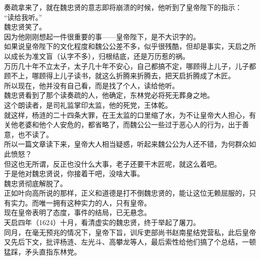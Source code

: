\begin{multicols}{\theparacolNo}
奏疏拿来了，就在魏忠贤的意志即将崩溃的时候，他听到了皇帝陛下的指示：\\

“读给我听。”\\

魏忠贤笑了。\\

因为他刚刚想起一件很重要的事——皇帝陛下，是不大识字的。\\

如果说皇帝陛下的文化程度和魏公公差不多，似乎很残酷，但却是事实，天启之所以成长为准文盲（认字不多），归根结底，还是万历惹的祸。\\

万历几十年不立太子，太子几十年不安心，自己都搞不定，哪顾得上儿子，儿子都顾不上，哪顾得上儿子读书，就这么折腾来折腾去，把天启折腾成了木匠。\\

所以现在，他并没有自己看，而是找了个人，读给他听。\\

魏忠贤看到了那个读奏疏的人，他确定，东林党必将死无葬身之地。\\

这个朗读者，是司礼监掌印太监，他的死党，王体乾。\\

就这样，杨涟的二十四条大罪，在王太监的口里缩了水，为不让皇帝大人担心，有关他老婆和他个人安危的，都省略了，而魏公公一些过于恶心人的行为，出于善意，也不读了。\\

所以一篇文章读下来，皇帝大人相当疑惑，听起来魏公公为人还不错，为何群众如此愤怒？\\

但这也无所谓，反正也没什么大事，老子还要干木匠呢，就这么着吧。\\

于是他对魏忠贤说，你接着干吧，没啥大事。\\

魏忠贤彻底解脱了。\\

正如叶向高所说的那样，正义和道德是打不倒魏忠贤的，能让这位无赖屈服的，只有实力。而唯一拥有这种实力的人，只有皇帝。\\

现在皇帝表明了态度，事件的结局，已无悬念。\\

天启四年（1624）十月，看清虚实的魏忠贤，终于举起了屠刀。\\

同月，在毫无预兆的情况下，皇帝下旨，训斥吏部尚书赵南星结党营私，此后皇帝又先后下文，批评杨涟、左光斗、高攀龙等人，最后索性给他们搞了个总结，一顿猛踩，矛头直指东林党。\\


\end{multicols}
